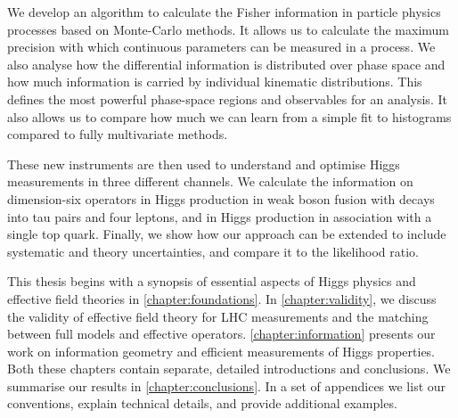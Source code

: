We develop an algorithm to calculate the Fisher information in
particle physics processes based on Monte-Carlo methods. It allows us
to calculate the maximum precision with which continuous parameters can
be measured in a process. We also analyse how the differential
information is distributed over phase space and how much information
is carried by individual kinematic distributions. This defines the
most powerful phase-space regions and observables for an analysis. It
also allows us to compare how much we can learn from a simple fit to
histograms compared to fully multivariate methods.

These new instruments are then used to understand and optimise Higgs
measurements in three different channels. We calculate the information
on dimension-six operators in Higgs production in weak boson fusion
with decays into tau pairs and four leptons, and in Higgs production
in association with a single top quark. Finally, we show how our
approach can be extended to include systematic and theory
uncertainties, and compare it to the likelihood ratio.

\newparagraph
%
This thesis begins with a synopsis of essential aspects of Higgs
physics and effective field theories in
\autoref{chapter:foundations}. In \autoref{chapter:validity}, we
discuss the validity of effective field theory for LHC measurements
and the matching between full models and effective
operators. \autoref{chapter:information} presents our work on
information geometry and efficient measurements of Higgs
properties. Both these chapters contain separate, detailed
introductions and conclusions. We summarise our results in
\autoref{chapter:conclusions}. In a set of appendices we list our
conventions, explain technical details, and provide additional
examples.
